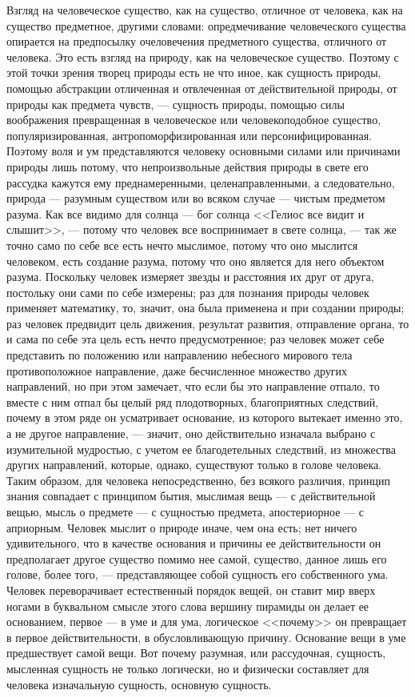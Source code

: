 \documentclass[12pt,oneside]{book}
\begin{document}
Взгляд на человеческое существо, как на существо, отличное от человека, как на существо предметное, другими словами: опредмечивание человеческого существа опирается на предпосылку очеловечения предметного существа, отличного от человека. Это есть взгляд на природу, как на человеческое существо. Поэтому с этой точки зрения творец природы есть не что иное, как сущность природы, помощью абстракции отличенная и отвлеченная от действительной природы, от природы как предмета чувств, --- сущность природы, помощью силы воображения превращенная в человеческое или человекоподобное существо, популяризированная, антропоморфизированная или персонифицированная. Поэтому воля и ум представляются человеку основными силами или причинами природы лишь потому, что непроизвольные действия природы в свете его рассудка кажутся ему преднамеренными, целенаправленными, а следовательно, природа --- разумным существом или во всяком случае --- чистым предметом разума. Как все видимо для солнца --- бог солнца <<Гелиос все видит и слышит>>, --- потому что человек все воспринимает в свете солнца, --- так же точно само по себе все есть нечто мыслимое, потому что оно мыслится человеком, есть создание разума, потому что оно является для него объектом разума. Поскольку человек измеряет звезды и расстояния их друг от друга, постольку они сами по себе измерены; раз для познания природы человек применяет математику, то, значит, она была применена и при создании природы; раз человек предвидит цель движения, результат развития, отправление органа, то и сама по себе эта цель есть нечто предусмотренное; раз человек может себе представить по положению или направлению небесного мирового тела противоположное направление, даже бесчисленное множество других направлений, но при этом замечает, что если бы это направление отпало, то вместе с ним отпал бы целый ряд плодотворных, благоприятных следствий, почему в этом ряде он усматривает основание, из которого вытекает именно это, а не другое направление, --- значит, оно действительно изначала выбрано с изумительной мудростью, с учетом ее благодетельных следствий, из множества других направлений, которые, однако, существуют только в голове человека. Таким образом, для человека непосредственно, без всякого различия, принцип знания совпадает с принципом бытия, мыслимая вещь --- с действительной вещью, мысль о предмете --- с сущностью предмета, апостериорное --- с априорным. Человек мыслит о природе иначе, чем она есть; нет ничего удивительного, что в качестве основания и причины ее действительности он предполагает другое существо помимо нее самой, существо, данное лишь его голове, более того, --- представляющее собой сущность его собственного ума. Человек переворачивает естественный порядок вещей, он ставит мир вверх ногами в буквальном смысле этого слова вершину пирамиды он делает ее основанием, первое --- в уме и для ума, логическое <<почему>> он превращает в первое действительности, в обусловливающую причину. Основание вещи в уме предшествует самой вещи. Вот почему разумная, или рассудочная, сущность, мысленная сущность не только логически, но и физически составляет для человека изначальную сущность, основную сущность.
\end{document}
